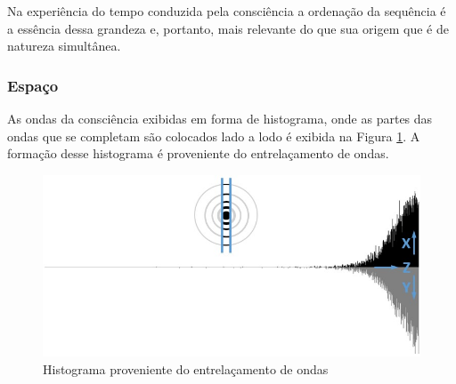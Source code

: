 Na experiência do tempo conduzida pela consciência a ordenação da sequência é a essência dessa grandeza e, portanto, mais relevante do que sua origem que é de natureza simultânea.

\subsubsection{Espaço}
As ondas da consciência exibidas em forma de histograma, onde as partes das ondas que se completam são colocados lado a lodo é exibida na Figura \ref{fig:consciousness_space_waves}. A formação desse histograma é proveniente do entrelaçamento de ondas.
	\begin{figure}[H]
	\caption{Histograma proveniente do entrelaçamento de ondas}
	\label{fig:consciousness_space_waves}
	\centering
	\includegraphics[scale=.7]{sections/images/consciousness_space_waves.jpg}
	\end{figure}

